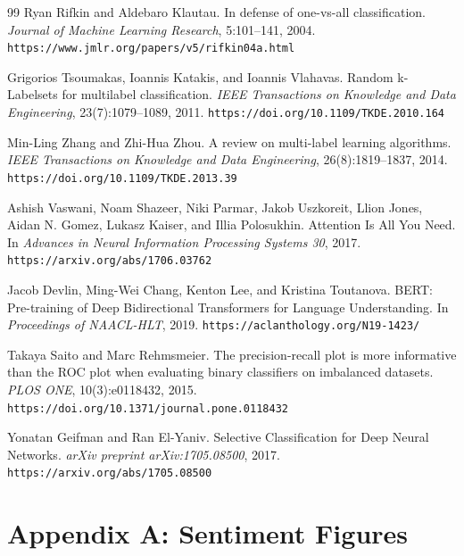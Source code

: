 \documentclass[12pt,a4paper]{article}
\begin{document}
\begin{thebibliography}{99}
Ryan Rifkin and Aldebaro Klautau.
In defense of one-vs-all classification.
\textit{Journal of Machine Learning Research}, 5:101--141, 2004.
\newline\texttt{https://www.jmlr.org/papers/v5/rifkin04a.html}

Grigorios Tsoumakas, Ioannis Katakis, and Ioannis Vlahavas.
Random k-Labelsets for multilabel classification.
\textit{IEEE Transactions on Knowledge and Data Engineering}, 23(7):1079--1089, 2011.
\newline\texttt{https://doi.org/10.1109/TKDE.2010.164}

Min-Ling Zhang and Zhi-Hua Zhou.
A review on multi-label learning algorithms.
\textit{IEEE Transactions on Knowledge and Data Engineering}, 26(8):1819--1837, 2014.
\newline\texttt{https://doi.org/10.1109/TKDE.2013.39}

Ashish Vaswani, Noam Shazeer, Niki Parmar, Jakob Uszkoreit, Llion Jones, Aidan N. Gomez, Lukasz Kaiser, and Illia Polosukhin.
Attention Is All You Need.
In \textit{Advances in Neural Information Processing Systems 30}, 2017.
\newline\texttt{https://arxiv.org/abs/1706.03762}

Jacob Devlin, Ming-Wei Chang, Kenton Lee, and Kristina Toutanova.
BERT: Pre-training of Deep Bidirectional Transformers for Language Understanding.
In \textit{Proceedings of NAACL-HLT}, 2019.
\newline\texttt{https://aclanthology.org/N19-1423/}

Takaya Saito and Marc Rehmsmeier.
The precision-recall plot is more informative than the ROC plot when evaluating binary classifiers on imbalanced datasets.
\textit{PLOS ONE}, 10(3):e0118432, 2015.
\newline\texttt{https://doi.org/10.1371/journal.pone.0118432}

Yonatan Geifman and Ran El-Yaniv.
Selective Classification for Deep Neural Networks.
\textit{arXiv preprint arXiv:1705.08500}, 2017.
\newline\texttt{https://arxiv.org/abs/1705.08500}

\end{thebibliography}

\clearpage
\section*{Appendix A: Sentiment Figures}
\end{document}
